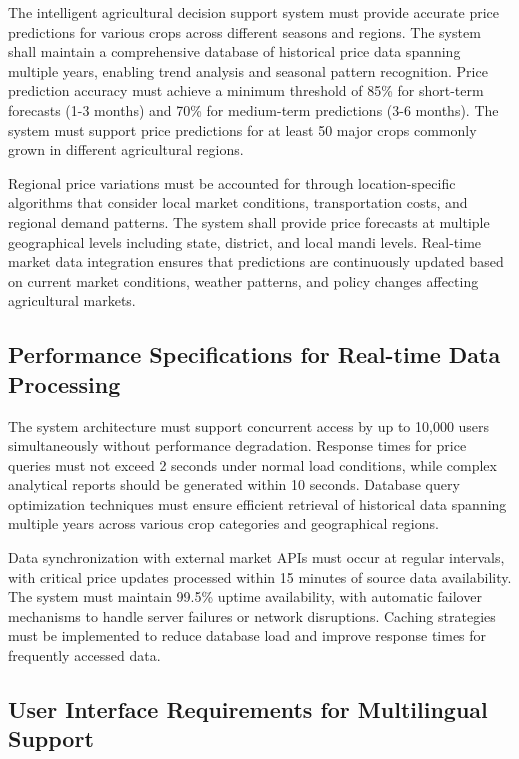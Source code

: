 The intelligent agricultural decision support system must provide accurate price predictions for various crops across different seasons and regions. The system shall maintain a comprehensive database of historical price data spanning multiple years, enabling trend analysis and seasonal pattern recognition. Price prediction accuracy must achieve a minimum threshold of 85\% for short-term forecasts (1-3 months) and 70\% for medium-term predictions (3-6 months). The system must support price predictions for at least 50 major crops commonly grown in different agricultural regions.

Regional price variations must be accounted for through location-specific algorithms that consider local market conditions, transportation costs, and regional demand patterns. The system shall provide price forecasts at multiple geographical levels including state, district, and local mandi levels. Real-time market data integration ensures that predictions are continuously updated based on current market conditions, weather patterns, and policy changes affecting agricultural markets.

\subsection{Performance Specifications for Real-time Data Processing}

The system architecture must support concurrent access by up to 10,000 users simultaneously without performance degradation. Response times for price queries must not exceed 2 seconds under normal load conditions, while complex analytical reports should be generated within 10 seconds. Database query optimization techniques must ensure efficient retrieval of historical data spanning multiple years across various crop categories and geographical regions.

Data synchronization with external market APIs must occur at regular intervals, with critical price updates processed within 15 minutes of source data availability. The system must maintain 99.5\% uptime availability, with automatic failover mechanisms to handle server failures or network disruptions. Caching strategies must be implemented to reduce database load and improve response times for frequently accessed data.

\subsection{User Interface Requirements for Multilingual Support}


